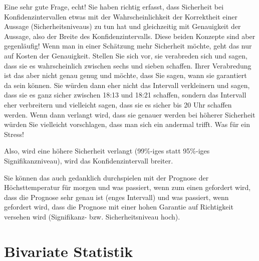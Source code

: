 \documentclass[
  10pt,
  letterpaper,
  a4paper, twoside]{scrreprt}
\begin{document}
\begin{tcolorbox}[enhanced jigsaw, coltitle=black, opacitybacktitle=0.6, toptitle=1mm, colbacktitle=quarto-callout-important-color!10!white, colback=white, toprule=.15mm, opacityback=0, bottomrule=.15mm, arc=.35mm, colframe=quarto-callout-important-color-frame, leftrule=.75mm, titlerule=0mm, breakable, left=2mm, rightrule=.15mm, title={Q\&A: Ist es nicht so, dass das Konfidenzintervall bei grösserer und
genauerer Sicherheit (zb eben 99\% anstatt 95\%) dann kleiner wird? Ich
dachte grosser KI bedeutet kleine Sicherheit und kleines bzw schmales KI
heisst grosse Sicherheit.}, bottomtitle=1mm]

Eine sehr gute Frage, echt! Sie haben richtig erfasst, dass Sicherheit
bei Konfidenzintervallen etwas mit der Wahrscheinlichkeit der
Korrektheit einer Aussage (Sicherheitsniveaus) zu tun hat und
gleichzeitig mit Genauigkeit der Aussage, also der Breite des
Konfidenzintervalls. Diese beiden Konzepte sind aber gegenläufig! Wenn
man in einer Schätzung mehr Sicherheit möchte, geht das nur auf Kosten
der Genauigkeit. Stellen Sie sich vor, sie verabreden sich und sagen,
dass sie es wahrscheinlich zwischen sechs und sieben schaffen. Ihrer
Verabredung ist das aber nicht genau genug und möchte, dass Sie sagen,
wann sie garantiert da sein können. Sie würden dann eher nicht das
Intervall verkleinern und sagen, dass sie es ganz sicher zwischen 18:13
und 18:21 schaffen, sondern das Intervall eher verbreitern und
vielleicht sagen, dass sie es sicher bis 20 Uhr schaffen werden. Wenn
dann verlangt wird, dass sie genauer werden bei höherer Sicherheit
würden Sie vielleicht vorschlagen, dass man sich ein andermal trifft.
Was für ein Stress!

Also, wird eine höhere Sicherheit verlangt (99\%-iges statt 95\%-iges
Signifikanzniveau), wird das Konfidenzintervall breiter.

Sie können das auch gedanklich durchspielen mit der Prognose der
Höchsttemperatur für morgen und was passiert, wenn zum einen gefordert
wird, dass die Prognose sehr genau ist (enges Intervall) und was
passiert, wenn gefordert wird, dass die Prognose mit einer hohen
Garantie auf Richtigkeit versehen wird (Signifikanz- bzw.
Sicherheitsniveau hoch).

\end{tcolorbox}

\section{Bivariate Statistik}\label{bivariate-statistik}
\end{document}
